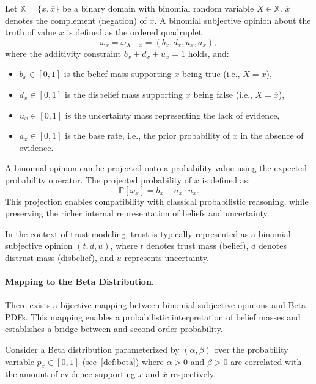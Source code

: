 \begin{definition} \label{binomial_opinion}
Let $\mathbb{X} = \{x, \overline{x}\}$ be a binary domain with binomial random variable $X \in \mathbb{X}$. $\overline{x}$ denotes the complement (negation) of $x$.
A binomial subjective opinion about the truth of value $x$ is defined as the ordered quadruplet
\[
\omega_x = \omega_{X=x} = (b_x, d_x, u_x, a_x),
\]
where the additivity constraint $b_x + d_x + u_x = 1$ holds, and:
\begin{itemize}
  \item \(b_x \in [0,1]\) is the belief mass supporting $x$ being true (i.e., $X = x$),
  \item \(d_x\in [0,1]\) is the disbelief mass supporting $x$ being false (i.e., $X = \overline{x}$),
  \item \(u_x\in [0,1]\) is the uncertainty mass representing the lack of evidence,
  \item \(a_x\in [0,1]\) is the base rate, i.e., the prior probability of $x$ in the absence of evidence.
\end{itemize}
\end{definition}

A binomial opinion can be projected onto a probability value using the expected probability operator. The projected probability of $x$ is defined as:
\begin{equation} \label{eq:projected_prob}
	\mathbb{P}[\omega_x] = b_x + a_x \cdot u_x.
\end{equation}
This projection enables compatibility with classical probabilistic reasoning, while preserving the richer internal representation of beliefs and uncertainty.


In the context of trust modeling, trust is typically represented as a binomial subjective opinion $(t, d, u)$, where $t$ denotes trust mass (belief), $d$ denotes distrust mass (disbelief), and $u$ represents uncertainty. 

\paragraph{Mapping to the Beta Distribution.}

There exists a bijective mapping between binomial subjective opinions and Beta \acp{PDF}. This mapping enables a probabilistic interpretation of belief masses and establishes a bridge between  and second order probability.

Consider a Beta distribution parameterized by $(\alpha, \beta)$ over the probability variable $p_x \in [0,1]$ (see~\cref{def:beta}) where $\alpha > 0$ and $\beta > 0$ are correlated with the amount of evidence supporting $x$ and $\overline{x}$ respectively.

